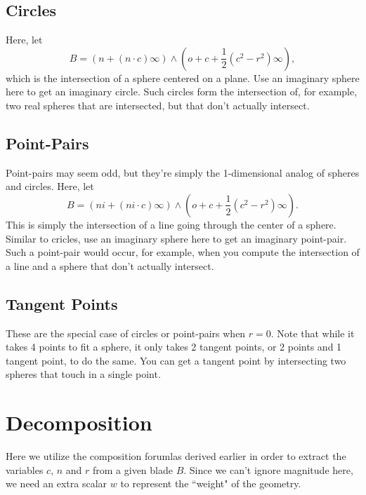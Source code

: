 \documentclass[12pt]{article}
\newcommand{\nvao}{o}
\newcommand{\nvai}{\infty}
\begin{document}
\subsection*{Circles}

Here, let
\begin{equation*}
B=\left(n + (n\cdot c)\nvai\right)\wedge\left(\nvao + c + \frac{1}{2}(c^2-r^2)\nvai\right),
\end{equation*}
which is the intersection of a sphere centered on a plane.  Use an imaginary sphere here
to get an imaginary circle.  Such circles form the intersection of, for example, two
real spheres that are intersected, but that don't actually intersect.

\subsection*{Point-Pairs}

Point-pairs may seem odd, but they're simply the 1-dimensional analog of spheres and circles.
Here, let
\begin{equation*}
B=(ni+(ni\cdot c)\nvai)\wedge\left(\nvao + c + \frac{1}{2}(c^2 - r^2)\nvai\right).
\end{equation*}
This is simply the intersection of a line going through the center of a sphere.
Similar to cricles, use an imaginary sphere here to get an imaginary point-pair.
Such a point-pair would occur, for example, when you compute the intersection
of a line and a sphere that don't actually intersect.

\subsection*{Tangent Points}

These are the special case of circles or point-pairs when $r=0$.
Note that while it takes 4 points to fit a sphere, it only takes 2 tangent points, or 2 points and 1 tangent point, to do the same.
You can get a tangent point by intersecting two spheres that touch in a single point.

\section*{Decomposition}

Here we utilize the composition forumlas derived earlier in order to extract the variables $c$, $n$ and $r$
from a given blade $B$.  Since we can't ignore magnitude here, we need an extra scalar $w$
to represent the ``weight" of the geometry.
\end{document}
